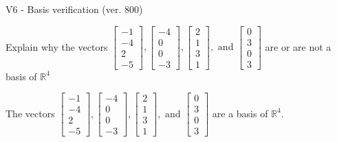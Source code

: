 \begin{exercise}
  \begin{exerciseTitle}V6 - Basis verification (ver. 800)\end{exerciseTitle}
  \begin{exerciseStatement}
    Explain why the vectors \(\left[\begin{array}{r}
-1 \\
-4 \\
2 \\
-5
\end{array}\right] , \left[\begin{array}{r}
-4 \\
0 \\
0 \\
-3
\end{array}\right] , \left[\begin{array}{r}
2 \\
1 \\
3 \\
1
\end{array}\right] , \text{ and } \left[\begin{array}{r}
0 \\
3 \\
0 \\
3
\end{array}\right]\) are or are not a basis of \(\mathbb{R}^4\)	


  \end{exerciseStatement}
  \begin{exerciseAnswer}
   The vectors \(\left[\begin{array}{r}
-1 \\
-4 \\
2 \\
-5
\end{array}\right] , \left[\begin{array}{r}
-4 \\
0 \\
0 \\
-3
\end{array}\right] , \left[\begin{array}{r}
2 \\
1 \\
3 \\
1
\end{array}\right] , \text{ and } \left[\begin{array}{r}
0 \\
3 \\
0 \\
3
\end{array}\right]\) 
  	 are  a basis of \(\mathbb{R}^4\).
  


  \end{exerciseAnswer}
\end{exercise}